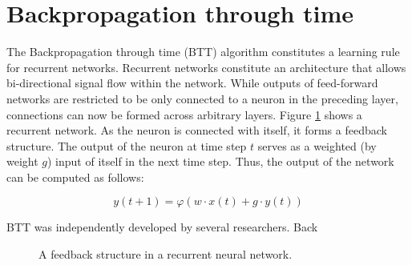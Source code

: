 \documentclass[10pt,a4paper,DIV=11]{scrreprt}
\begin{document}
 \section{Backpropagation through time}
 
 The Backpropagation through time (BTT) algorithm constitutes a learning rule for recurrent networks. 
 Recurrent networks constitute an architecture that allows bi-directional signal flow within the network. While outputs of feed-forward networks are restricted to be only connected to 
 a neuron in the preceding layer, connections can now be formed across arbitrary layers. Figure \ref{fig:feedback} shows a recurrent network. As the neuron is connected with
 itself, it forms a feedback structure. The output of the neuron at time step $t$ serves as a weighted (by weight $g$) input of itself in the next time step.
 Thus, the output of the network can be computed as follows:
 
 \begin{equation}
     y(t+1) = \varphi(w\cdot x(t) + g\cdot y(t))
 \label{eq:btt}
 \end{equation}
 
 BTT was independently developed by several researchers.%
 Back
 
 
 \begin{figure}[H]

 \centering
 \caption{A feedback structure in a recurrent neural network.}
 \label{fig:feedback}
 \end{figure}
 
\end{document}
